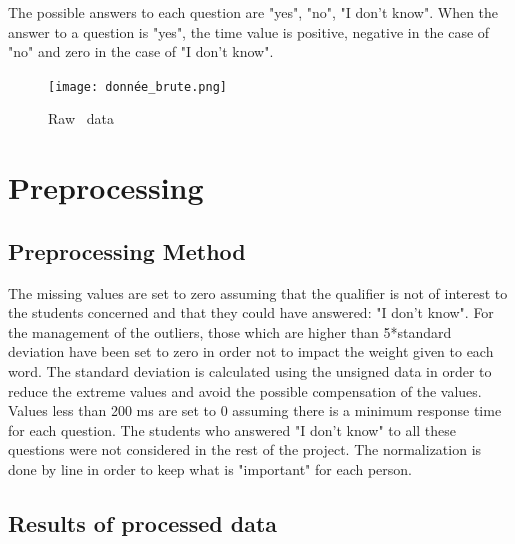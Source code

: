 \documentclass[12pt]{article}
\begin{document}
The possible answers to each question are "yes", "no", "I don't know". When the answer to a question is "yes", the time value is positive, negative in the case of "no" and zero in the case of "I don't know".


\begin{figure}[h]
\begin{center}
\texttt{[image: donnée\_brute.png]} 
\caption[]{ Raw \ data}
\end{center}
\end{figure}


\section{Preprocessing}

\subsection{Preprocessing Method}


The missing values are set to zero assuming that the qualifier is not of interest to the students concerned and that they could have answered: "I don't know".
For the management of the outliers, those which are higher than 5*standard deviation have been set to zero in order not to impact the weight given to each word. The standard deviation is calculated using the unsigned data in order to reduce the extreme values and avoid the possible compensation of the values.
Values less than 200 ms are set to 0 assuming there is a minimum response time for each question.
The students who answered "I don't know" to all these questions were not considered in the rest of the project.  
The normalization is done by line in order to keep what is "important" for each person. 

\newpage

\subsection{Results of processed data}
\end{document}
